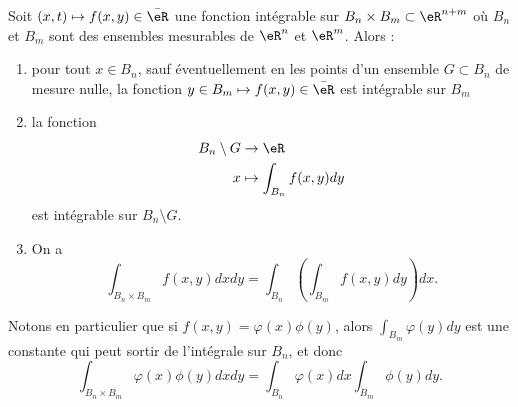 \begin{theorem}[Fubini]\label{ThoFubini}
	Soit $(x,t)\mapsto f(x,y)\in\bar \eR$ une fonction intégrable sur $B_n\times B_m\subset\eR^{n+m}$ où $B_n$ et $B_m$ sont des ensembles mesurables de $\eR^n$ et $\eR^m$. Alors :
	\begin{enumerate}
		\item pour tout $x\in B_n$, sauf éventuellement en les points d'un ensemble $G\subset B_n$ de mesure nulle, la fonction $y\in B_m\mapsto f(x,y)\in\bar\eR$ est intégrable sur $B_m$
		\item
		      la fonction
		      \begin{equation}
			      \begin{aligned}
				      B_n\setminus G & \to \eR                    \\
				      x              & \mapsto \int_{B_n}f(x,y)dy
			      \end{aligned}
		      \end{equation}
		      est intégrable sur $B_n\setminus G$.
		\item
		      On a
		      \begin{equation}
			      \int_{B_n\times B_m}f(x,y)dxdy=\int_{B_n}\left( \int_{B_m}f(x,y)dy \right)dx.
		      \end{equation}

	\end{enumerate}
\end{theorem}

Notons en particulier que si $f(x,y)=\varphi(x)\phi(y)$, alors $\int_{B_m}\varphi(y)dy$ est une constante qui peut sortir de l'intégrale sur $B_n$, et donc
\begin{equation}		\label{EqFubiniFactori}
	\int_{B_n\times B_m}\varphi(x)\phi(y)dxdy=\int_{B_n}\varphi(x)dx\int_{B_m}\phi(y)dy.
\end{equation}

